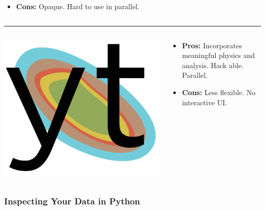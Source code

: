 \documentclass[]{beamer}
\begin{document}
\begin{frame}
\begin{columns}
\begin{column}{6cm}
\begin{itemize}
      \item \textbf{\color{red}Cons:} Opaque. Hard to use in parallel.
      \end{itemize}
    \end{column}
  \end{columns}
  \noindent\rule{\textwidth}{1pt}
  \begin{columns}
    \begin{column}{6cm}
      \begin{center}
        \includegraphics[width=0.4\columnwidth]{figures/yt_logo}
      \end{center}
    \end{column}
    \begin{column}{6cm}
      \begin{itemize}
      \item \textbf{\color{green}Pros:} Incorporates meaningful
        physics and analysis. Hack able. Parallel.
      \item \textbf{\color{red}Cons:} Less flexible. No interactive UI.
      \end{itemize}
    \end{column}
  \end{columns}
\end{frame}

\begin{frame}
  \frametitle{Inspecting Your Data in Python}
  
\end{frame}
\end{document}

